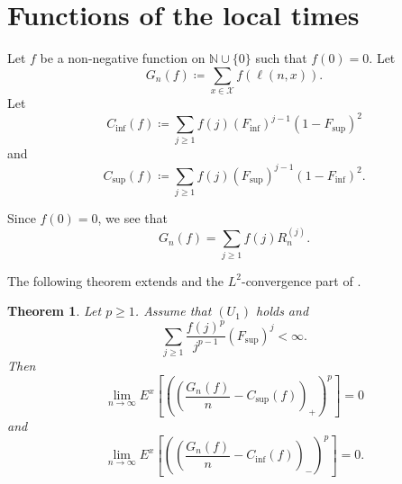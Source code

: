 \documentclass[a4paper, reqno, 11pt]{amsart}
\newtheorem{Thm}{Theorem}[section]
\theoremstyle{definition}
\begin{document}
\section{Functions of the local times}\label{sec:local-times}

Let $f$ be a non-negative function on $\mathbb{N} \cup \{0\}$ such that $f(0) = 0$. 
Let 
\[ G_n (f) \coloneqq \sum_{x \in \mathcal{X}} f(\ell(n,x)). \]
Let 
\[ C_{\inf}(f) \coloneqq \sum_{j \ge 1} f(j) (F_{\inf})^{j-1} (1-F_{\sup})^2 \]
and 
\[ C_{\sup}(f) \coloneqq \sum_{j \ge 1} f(j) (F_{\sup})^{j-1} (1-F_{\inf})^2. \]

Since $f(0) = 0$, we see that 
\[ G_n (f) = \sum_{j \ge 1} f(j) R_n^{(j)}. \] 


The following theorem extends  \cite[Theorem 2]{CCMP2026} and the $L^2$-convergence part of \cite[Theorem 1]{AK2020}. 

\begin{Thm}\label{thm:func-loc-time-Lp}
Let $p \ge 1$. 
Assume that  $(U_1)$ holds and 
\[ \sum_{j \ge 1} \frac{f(j)^p}{j^{p-1}} (F_{\sup})^{j} < \infty.  \]
Then 
\begin{equation}\label{eq:L2-sup-upper} 
\lim_{n \to \infty} E^x \left[ \left(\left( \frac{G_n (f)}{n} - C_{\sup}(f) \right)_{+}\right)^p \right] = 0 
\end{equation} 
and 
\begin{equation}\label{eq:L2-inf-lower}   
\lim_{n \to \infty} E^x \left[ \left(\left( \frac{G_n (f)}{n} - C_{\inf}(f) \right)_{-}\right)^p \right] = 0. 
\end{equation} 
\end{Thm}
\end{document}
